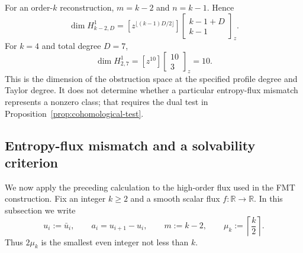 \documentclass[11pt]{amsart}
\theoremstyle{plain}
\theoremstyle{definition}
\theoremstyle{remark}
\numberwithin{equation}{section}
\theoremstyle{plain}
\begin{document}
For an order-$k$ reconstruction, $m=k-2$ and $n=k-1$.  Hence
\begin{equation}\label{eq:order-k-cohomology-dimension}
	\dim H^1_{k-2,D}
	=
	[z^{\lfloor (k-1)D/2\rfloor}]
	\begin{bmatrix}k-1+D\\ k-1\end{bmatrix}_z.
\end{equation}
For $k=4$ and total degree $D=7$,
\begin{equation}\label{eq:fourth-order-cohomology-dimension}
	\dim H^1_{2,7}
	=[z^{10}]
	\begin{bmatrix}10\\3\end{bmatrix}_z
	=10.
\end{equation}
This is the dimension of the obstruction space at the specified profile
degree and Taylor degree.  It does not determine whether a particular
entropy-flux mismatch represents a nonzero class; that requires the dual test
in Proposition~\ref{prop:cohomological-test}.

\subsection{Entropy-flux mismatch and a solvability criterion}
\label{sec:fmt-mismatch}

We now apply the preceding calculation to the high-order flux used in the
FMT construction.  Fix an integer $k\ge2$ and a smooth scalar flux
$f:\mathbb R\to\mathbb R$.  In this subsection we write
\begin{equation}\label{eq:fmt-profile-parameters}
	u_i:=\bar u_i,
	\qquad
	a_i=u_{i+1}-u_i,
	\qquad
	m:=k-2,
	\qquad
	\mu_k:=\left\lceil\frac{k}{2}\right\rceil.
\end{equation}
Thus $2\mu_k$ is the smallest even integer not less than $k$.
\end{document}
